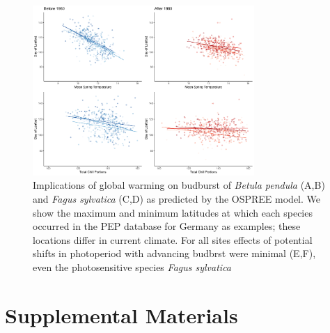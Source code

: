 \documentclass{article}
\begin{document}
\newpage
\begin{figure}[h!]
\centering
\noindent \includegraphics[width=0.75\textwidth]{..//..//analyses/bb_analysis/PEP_climate/figures/BETPEN_multruns_portions.pdf}
\caption{Implications of global warming on budburst of \emph{Betula pendula} (A,B) and \emph{Fagus sylvatica} (C,D) as predicted by the OSPREE model. We show the maximum and minimum latitudes at which each species occurred in the PEP database for Germany as examples; these locations differ in current climate. For all sites effects of potential shifts in photoperiod with advancing budbrst were minimal (E,F), even the photosensitive species \emph{Fagus sylvatica}}
\label{fig:pep}
\end{figure}

\section*{Supplemental Materials}
\end{document}
